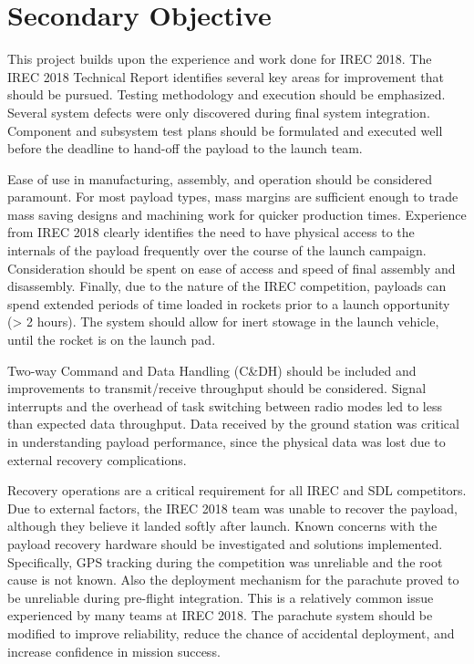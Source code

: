 \documentclass[conference]{IEEEtran} %
\begin{document}
\section{Secondary Objective}
\label{sec:secondary-obj}

This project builds upon the experience and work done for IREC 2018. The  IREC 2018 Technical Report identifies several key areas for improvement that should be pursued. Testing methodology and execution should be emphasized. Several system defects were only discovered during final system integration. Component and subsystem test plans should be formulated and executed well before the deadline to hand-off the payload to the launch team.

Ease of use in manufacturing, assembly, and operation should be considered paramount. For most payload types, mass margins are sufficient enough to trade mass saving designs and machining work for quicker production times. Experience from IREC 2018 clearly identifies the need to have physical access to the internals of the payload frequently over the course of the launch campaign. Consideration should be spent on ease of access and speed of final assembly and disassembly. Finally, due to the nature of the IREC competition, payloads can spend extended periods of time loaded in rockets prior to a launch opportunity (> 2 hours). The system should allow for inert stowage in the launch vehicle, until the rocket is on the launch pad.

Two-way Command and Data Handling (C\&DH) should be included and improvements to transmit/receive throughput should be considered. Signal interrupts and the overhead of task switching between radio modes led to less than expected data throughput. Data received by the ground station was critical in understanding payload performance, since the physical data was lost due to external recovery complications.

Recovery operations are a critical requirement for all IREC and SDL competitors. Due to external factors, the IREC 2018 team was unable to recover the payload, although they believe it landed softly after launch. Known concerns with the payload recovery hardware should be investigated and solutions implemented. Specifically, GPS tracking during the competition was unreliable and the root cause is not known. Also the deployment mechanism for the parachute proved to be unreliable during pre-flight integration. This is a relatively common issue experienced by many teams at IREC 2018. The parachute system should be modified to improve reliability, reduce the chance of accidental deployment, and increase confidence in mission success.
\end{document}
